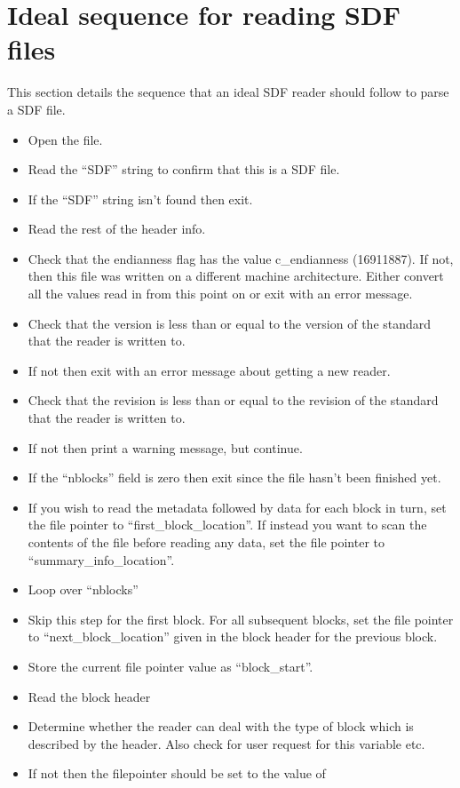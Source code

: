 \documentclass[12pt]{article}
\begin{document}
\section{Ideal sequence for reading SDF files}
This section details the sequence that an ideal SDF reader should follow to
parse a SDF file.
\begin{itemize}
\item Open the file.
\item Read the ``SDF'' string to confirm that this is a SDF file.
\item If the ``SDF'' string isn't found then exit.
\item Read the rest of the header info.
\item Check that the endianness flag has the value c\_endianness (16911887).
  If not, then this file was written on a different machine architecture.
  Either convert all the values read in from this point on or exit with an
  error message.
\item Check that the version is less than or equal to the version of the
  standard that the reader is written to.
\item If not then exit with an error message about getting a new reader.
\item Check that the revision is less than or equal to the revision of the
  standard that the reader is written to.
\item If not then print a warning message, but continue.
\item If the ``nblocks'' field is zero then exit since the file hasn't been
  finished yet.
\item If you wish to read the metadata followed by data for each block in
  turn, set the file pointer to ``first\_block\_location''. If instead you want
  to scan the contents of the file before reading any data, set the file
  pointer to ``summary\_info\_location''.
\item Loop over ``nblocks''
\item Skip this step for the first block. For all subsequent blocks, set the
  file pointer to ``next\_block\_location'' given in the block header for the
  previous block.
\item Store the current file pointer value as ``block\_start''.
\item Read the block header
\item Determine whether the reader can deal with the type of block which is
  described by the header. Also check for user request for this variable etc.
\item If not then the filepointer should be set to the value of

\end{itemize}
\end{document}
